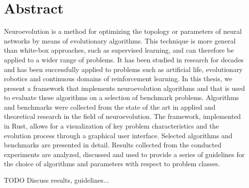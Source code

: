 \section*{Abstract}

Neuroevolution is a method for optimizing the topology or parameters of neural networks by means of evolutionary algorithms.
This technique is more general than white-box approaches, such as supervised learning, and can therefore be applied to a wider range of
problems. It has been studied in research for decades and has been successfully applied to problems such as artificial life,
evolutionary robotics and continuous domains of reinforcement learning.
In this thesis, we present a framework that implements neuroevolution algorithms and that is used to evaluate these algorithms on a
selection of benchmark problems. Algorithms and benchmarks were collected from the state of the art in applied and theoretical research in
the field of neuroevolution. The framework, implemented in Rust, allows for a visualization of key problem characteristics and the evolution
process through a graphical user interface. Selected algorithms and benchmarks are presented in detail. Results collected from the conducted
experiments are analyzed, discussed and used to provide a series of guidelines for the choice of algorithms and parameters with respect
to problem classes.

TODO Discuss results, guidelines...
